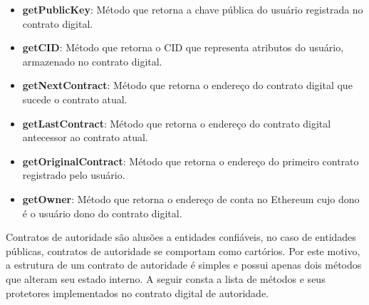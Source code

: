 \documentclass[tcc,capa]{texufpel}
\begin{document}
\begin{itemize}
        \item \textbf{getPublicKey}: Método que retorna a chave pública do usuário registrada no contrato digital.
        
        \item \textbf{getCID}: Método que retorna o CID que representa atributos do usuário, armazenado no contrato digital.
        
        \item \textbf{getNextContract}: Método que retorna o endereço do contrato digital que sucede o contrato atual.

        \item \textbf{getLastContract}: Método que retorna o endereço do contrato digital antecessor ao contrato atual.
        
        \item \textbf{getOriginalContract}: Método que retorna o endereço do primeiro contrato registrado pelo usuário.
        
        \item \textbf{getOwner}: Método que retorna o endereço de conta no Ethereum cujo dono é o usuário dono do contrato digital.
    \end{itemize}
    
    Contratos de autoridade são alusões a entidades confiáveis, no caso de entidades públicas, contratos de autoridade se comportam como cartórios. Por este motivo, a estrutura de um contrato de autoridade é simples e possui apenas dois métodos que alteram seu estado interno. A seguir consta a lista de métodos e seus protetores implementados no contrato digital de autoridade. 
    
\end{document}
